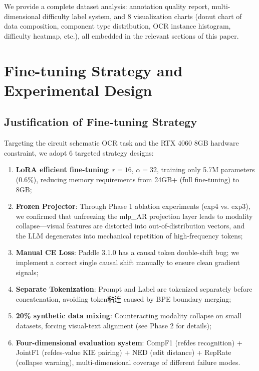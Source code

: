 We provide a complete dataset analysis: annotation quality report, multi-dimensional difficulty label system, and 8 visualization charts (donut chart of data composition, component type distribution, OCR instance histogram, difficulty heatmap, etc.), all embedded in the relevant sections of this paper.

\section{Fine-tuning Strategy and Experimental Design}

\subsection{Justification of Fine-tuning Strategy}

Targeting the circuit schematic OCR task and the RTX 4060 8GB hardware constraint, we adopt 6 targeted strategy designs:

\begin{enumerate}[nosep]
    \item \textbf{LoRA efficient fine-tuning}: $r=16$, $\alpha=32$, training only 5.7M parameters (0.6\%), reducing memory requirements from 24GB+ (full fine-tuning) to 8GB;
    \item \textbf{Frozen Projector}: Through Phase 1 ablation experiments (exp4 vs. exp3), we confirmed that unfreezing the mlp\_AR projection layer leads to modality collapse---visual features are distorted into out-of-distribution vectors, and the LLM degenerates into mechanical repetition of high-frequency tokens;
    \item \textbf{Manual CE Loss}: Paddle 3.1.0 has a causal token double-shift bug; we implement a correct single causal shift manually to ensure clean gradient signals;
    \item \textbf{Separate Tokenization}: Prompt and Label are tokenized separately before concatenation, avoiding token粘连 caused by BPE boundary merging;
    \item \textbf{20\% synthetic data mixing}: Counteracting modality collapse on small datasets, forcing visual-text alignment (see Phase 2 for details);
    \item \textbf{Four-dimensional evaluation system}: CompF1 (refdes recognition) + JointF1 (refdes-value KIE pairing) + NED (edit distance) + RepRate (collapse warning), multi-dimensional coverage of different failure modes.
\end{enumerate}

